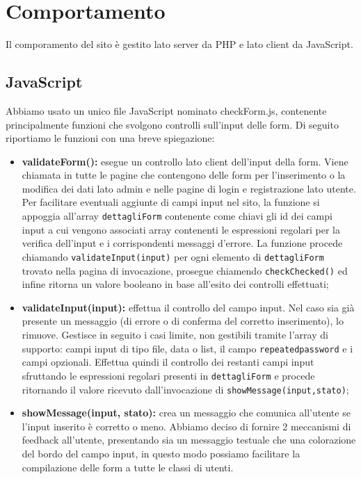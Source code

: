 \section{Comportamento}
Il comporamento del sito è gestito lato server da PHP e lato client da JavaScript.

\subsection{JavaScript}
Abbiamo usato un unico file JavaScript nominato checkForm.js, contenente principalmente funzioni che svolgono controlli sull'input delle form.
Di seguito riportiamo le funzioni con una breve spiegazione:

\begin{itemize}
	\item \textbf{validateForm(): } esegue un controllo lato client dell'input della form. Viene chiamata in tutte le pagine che contengono delle form per l'inserimento o la modifica dei dati lato admin e nelle pagine di login e registrazione lato utente.
	Per facilitare eventuali aggiunte di campi input nel sito, la funzione si appoggia all'array \texttt{dettagliForm} contenente come chiavi gli id dei campi input a cui vengono associati array contenenti le espressioni regolari per la verifica dell'input e i corrispondenti messaggi d'errore.
	La funzione procede chiamando \texttt{validateInput(input)} per ogni elemento di \texttt{dettagliForm} trovato nella pagina di invocazione, prosegue chiamendo \texttt{checkChecked()} ed infine ritorna un valore booleano in base all'esito dei controlli effettuati; \\

	\item \textbf{validateInput(input): } effettua il controllo del campo input. Nel caso sia già presente un messaggio (di errore o di conferma del corretto inserimento), lo rimuove. Gestisce in seguito i casi limite, non gestibili tramite l'array di supporto: campi input di tipo file, data o list, il campo \texttt{repeatedpassword} e i campi opzionali. Effettua quindi il controllo dei restanti campi input sfruttando le espressioni regolari presenti in \texttt{dettagliForm} e procede ritornando il valore ricevuto dall'invocazione di \texttt{showMessage(input,stato)}; \\

	\item \textbf{showMessage(input, stato): } crea un messaggio che comunica all'utente se l'input inserito è corretto o meno. Abbiamo deciso di fornire 2 meccanismi di feedback all'utente, presentando sia un messaggio testuale che una colorazione del bordo del campo input, in questo modo possiamo facilitare la compilazione delle form a tutte le classi di utenti. \\


\end{itemize}
